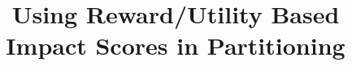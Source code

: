 \documentclass[letterpaper]{article}
\begin{document}





\title{Using Reward/Utility Based Impact Scores in Partitioning}
\author{%
}



\maketitle
\end{document}
